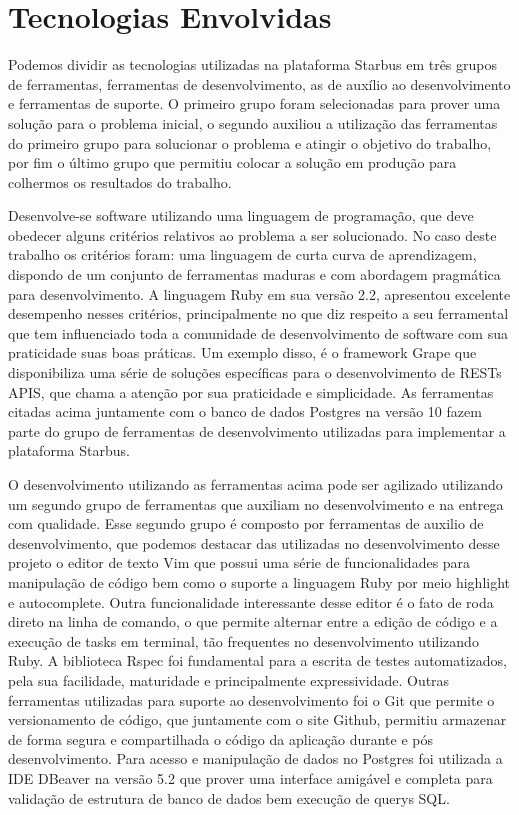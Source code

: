 \chapter{Tecnologias Envolvidas} \label{cha:tecnologias-envolvidas}

Podemos dividir as tecnologias utilizadas na plataforma Starbus em três grupos de ferramentas, ferramentas de desenvolvimento, 
as de auxílio ao desenvolvimento e ferramentas de suporte. O primeiro grupo foram selecionadas para prover uma solução para o 
problema inicial, o segundo auxiliou a utilização das ferramentas do primeiro grupo para solucionar o problema e atingir o 
objetivo do trabalho, por fim o último grupo que permitiu colocar a solução em produção para colhermos os resultados do trabalho. 

Desenvolve-se software utilizando uma linguagem de programação, que deve obedecer alguns critérios relativos ao problema a ser solucionado. 
No caso deste trabalho os critérios foram: uma linguagem de curta curva de aprendizagem, dispondo de um conjunto de ferramentas maduras e 
com abordagem pragmática para desenvolvimento. A linguagem Ruby em sua versão 2.2, apresentou excelente desempenho nesses critérios, 
principalmente no que diz respeito a seu ferramental que tem influenciado toda a comunidade de desenvolvimento de software com sua praticidade 
suas boas práticas. Um exemplo disso, é o framework Grape que disponibiliza uma série de soluções específicas para o desenvolvimento de 
RESTs APIS, que chama a atenção por sua praticidade e simplicidade. As ferramentas citadas acima juntamente com o banco de dados Postgres na 
versão 10 fazem parte do grupo de ferramentas de desenvolvimento utilizadas para implementar a plataforma Starbus.

O desenvolvimento utilizando as ferramentas acima pode ser agilizado utilizando um segundo grupo de ferramentas que auxiliam no desenvolvimento 
e na entrega com qualidade. Esse segundo grupo é composto por ferramentas de auxilio de desenvolvimento, que podemos destacar das utilizadas no 
desenvolvimento desse projeto o editor de texto Vim que possui uma série de funcionalidades para manipulação de código bem como o suporte a 
linguagem Ruby por meio highlight e autocomplete. Outra funcionalidade interessante desse editor é o fato de roda direto na linha de comando, 
o que permite alternar entre a edição de código e a execução de tasks em terminal, tão frequentes no desenvolvimento utilizando Ruby. 
A biblioteca Rspec foi fundamental para a escrita de testes automatizados, pela sua facilidade, maturidade e principalmente expressividade. 
Outras ferramentas utilizadas para suporte ao desenvolvimento foi o Git que permite o versionamento de código, que juntamente com o site Github, 
permitiu armazenar de forma segura e compartilhada o código da aplicação durante e pós desenvolvimento. Para acesso e manipulação de dados no Postgres 
foi utilizada a IDE DBeaver na versão 5.2 que prover uma interface amigável e completa para validação de estrutura de banco de dados bem execução de querys SQL. 

